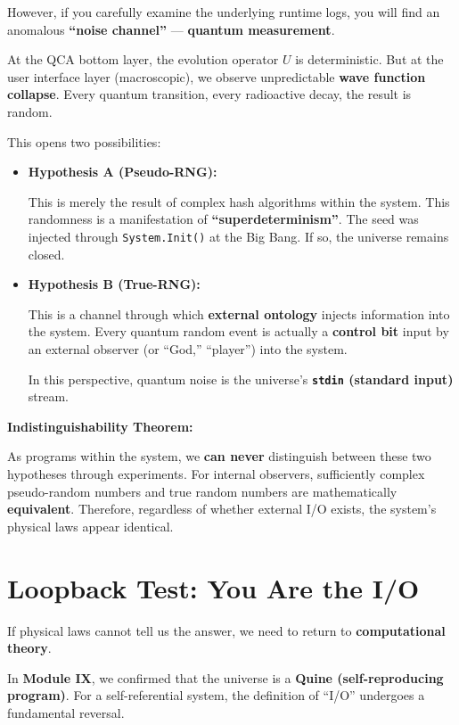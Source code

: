 \documentclass[11pt,a4paper,twoside]{book}
\begin{document}
However, if you carefully examine the underlying runtime logs, you will find an anomalous \textbf{``noise channel''} --- \textbf{quantum measurement}.

At the QCA bottom layer, the evolution operator \textbf{$U$} is deterministic. But at the user interface layer (macroscopic), we observe unpredictable \textbf{wave function collapse}. Every quantum transition, every radioactive decay, the result is random.

This opens two possibilities:

\begin{itemize}
\item \textbf{Hypothesis A (Pseudo-RNG):}

This is merely the result of complex hash algorithms within the system. This randomness is a manifestation of \textbf{``superdeterminism''}. The seed was injected through \texttt{System.Init()} at the Big Bang. If so, the universe remains closed.

\item \textbf{Hypothesis B (True-RNG):}

This is a channel through which \textbf{external ontology} injects information into the system. Every quantum random event is actually a \textbf{control bit} input by an external observer (or ``God,'' ``player'') into the system.

In this perspective, quantum noise is the universe's \textbf{\texttt{stdin} (standard input)} stream.
\end{itemize}

\textbf{Indistinguishability Theorem:}

As programs within the system, we \textbf{can never} distinguish between these two hypotheses through experiments. For internal observers, sufficiently complex pseudo-random numbers and true random numbers are mathematically \textbf{equivalent}. Therefore, regardless of whether external I/O exists, the system's physical laws appear identical.

\section{Loopback Test: You Are the I/O}

If physical laws cannot tell us the answer, we need to return to \textbf{computational theory}.

In \textbf{Module IX}, we confirmed that the universe is a \textbf{Quine (self-reproducing program)}. For a self-referential system, the definition of ``I/O'' undergoes a fundamental reversal.
\end{document}
